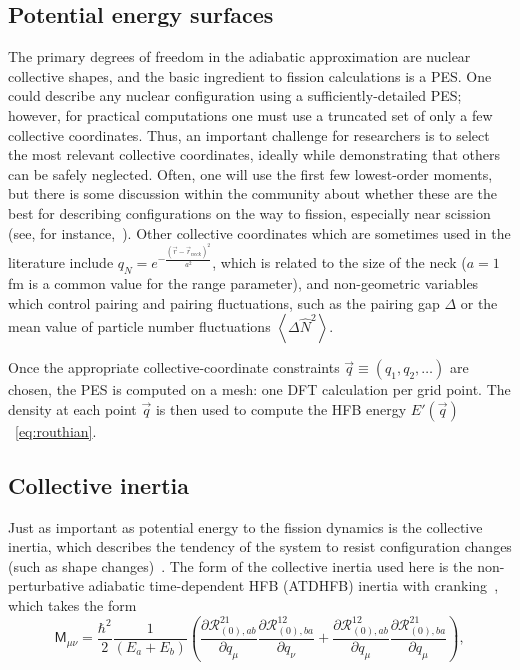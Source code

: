 \subsection{Potential energy surfaces}
The primary degrees of freedom in the adiabatic approximation are nuclear collective shapes, and the basic ingredient to fission calculations is a PES. One could describe any nuclear configuration using a sufficiently-detailed PES; however, for practical computations one must use a truncated set of only a few collective coordinates. Thus, an important challenge for researchers is to select the most relevant collective coordinates, ideally while demonstrating that others can be safely neglected. Often, one will use the first few lowest-order moments, but there is some discussion within the community about whether these are the best for describing configurations on the way to fission, especially near scission (see, for instance,~\cite{younes2012}). Other collective coordinates which are sometimes used in the literature include $q_N=e^{-\frac{(\vec{r}-\vec{r}_{neck})^2}{a^2}}$, which is related to the size of the neck ($a=1$ fm is a common value for the range parameter), and non-geometric variables which control pairing and pairing fluctuations, such as the pairing gap $\Delta$ or the mean value of particle number fluctuations $\left\langle \Delta \hat{N}^2 \right\rangle$.

Once the appropriate collective-coordinate constraints $\vec{q}\equiv(q_1, q_2, \dots)$ are chosen, the PES is computed on a mesh: one DFT calculation per grid point. The density at each point $\vec{q}$ is then used to compute the HFB energy $E'(\vec{q})$~\eqref{eq:routhian}.

\subsection{Collective inertia}
Just as important as potential energy to the fission dynamics is the collective inertia, which describes the tendency of the system to resist configuration changes (such as shape changes)~\cite{Hill1953}. The form of the collective inertia used here is the non-perturbative adiabatic time-dependent HFB (ATDHFB) inertia with cranking~\cite{Baran2011}, which takes the form
\begin{equation}\label{eq:mATDHFB-np}
\mathsf{M}_{\mu\nu} =  \frac{\hbar^2}{2}\frac{1}{(E_a+E_b)}\left(\frac{\partial\mathcal{R}^{21}_{(0),ab}}{\partial q_\mu}\frac{\partial\mathcal{R}^{12}_{(0),ba}}{\partial q_\nu}+\frac{\partial\mathcal{R}^{12}_{(0),ab}}{\partial q_\mu}\frac{\partial\mathcal{R}^{21}_{(0),ba}}{\partial q_\mu}\right),
\end{equation}

